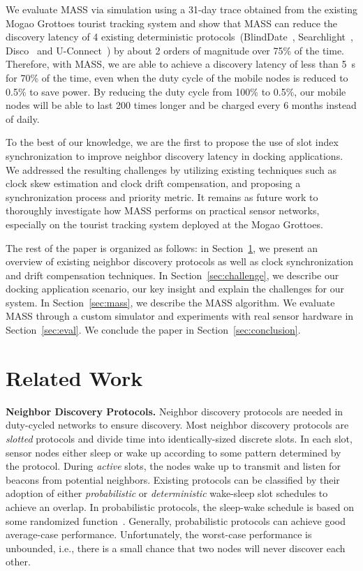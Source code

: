 \documentclass[twoside,twocolumn]{article}
\begin{document}
We evaluate MASS via simulation using a 31-day trace obtained from the existing Mogao Grottoes tourist tracking system
and show that MASS can reduce the discovery latency of 4 existing deterministic protocols~(BlindDate~\citep{wang13blinddate}, 
Searchlight~\citep{bakht2012searchlight}, Disco~\citep{Dutta2008Practical} and U-Connect~\citep{kandhalu2010u}) by about 2 
orders of magnitude over 75\% of the time. Therefore, with MASS, we are able to achieve a discovery latency of less than 5~s
for 70\% of the time, even when the duty cycle of the mobile nodes is reduced to 0.5\% to save power. By reducing the duty 
cycle from 100\% to 0.5\%, our mobile nodes will be able to last 200 times longer and be charged every 6 months instead of daily.

To the best of our knowledge, we are the first to propose the use of slot index synchronization to improve neighbor discovery
latency in docking applications. We addressed the resulting challenges by utilizing existing techniques such as clock skew
estimation and clock drift compensation, and proposing a synchronization process and priority metric. It remains as future
work to thoroughly investigate how MASS performs on practical sensor networks, especially on the tourist tracking system
deployed at the Mogao Grottoes.

The rest of the paper is organized as follows: in Section~\ref{sec:related}, we present an overview of existing neighbor 
discovery protocols as well as clock synchronization and drift compensation techniques. In Section~\ref{sec:challenge}, 
we describe our docking application scenario, our key insight and explain the challenges for our system. In Section~\ref{sec:mass}, 
we describe the MASS algorithm. We evaluate MASS through a custom simulator and experiments with real sensor hardware 
in Section~\ref{sec:eval}. We conclude the paper in Section~\ref{sec:conclusion}.

\section{Related Work}
\label{sec:related}

{\bf Neighbor Discovery Protocols.} Neighbor discovery protocols are needed in duty-cycled 
networks to ensure discovery. Most neighbor discovery protocols are \emph{slotted} protocols
and divide time into identically-sized discrete slots. In each slot, sensor nodes either
sleep or wake up according to some pattern determined by the protocol. During \emph{active}
slots, the nodes wake up to transmit and listen for beacons from potential neighbors.
Existing protocols can be classified by their adoption of either \emph{probabilistic} or 
\emph{deterministic} wake-sleep slot schedules to achieve an overlap. In probabilistic 
protocols, the sleep-wake schedule is based on some randomized function~\citep{mcglynn2001birthday}. 
Generally, probabilistic protocols can achieve good average-case performance. Unfortunately, 
the worst-case performance is unbounded, i.e., there is a small chance that two nodes will 
never discover each other.
\end{document}
